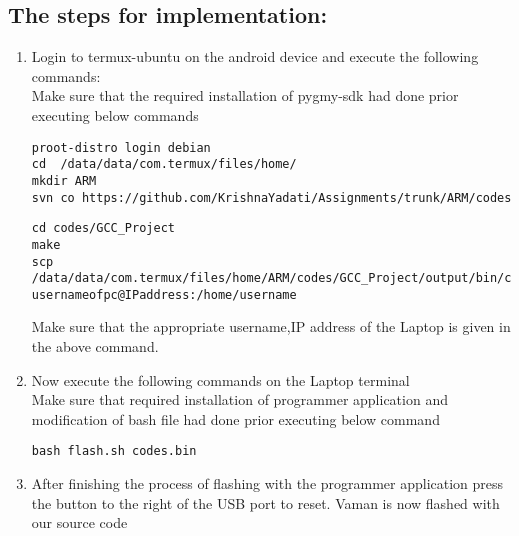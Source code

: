 \documentclass[10pt, a4paper]{article}
\begin{document}
\subsection{The steps for implementation:}
\begin{enumerate}
\item Login to termux-ubuntu on the android device and execute the following commands:\\
Make sure that the required installation of pygmy-sdk had done prior executing below commands
\begin{lstlisting}
proot-distro login debian
cd  /data/data/com.termux/files/home/
mkdir ARM
svn co https://github.com/KrishnaYadati/Assignments/trunk/ARM/codes
\end{lstlisting}
\begin{lstlisting}
cd codes/GCC_Project
make
scp /data/data/com.termux/files/home/ARM/codes/GCC_Project/output/bin/codes.bin usernameofpc@IPaddress:/home/username
\end{lstlisting}
Make sure that the appropriate username,IP address of the Laptop is given in the above command.
\item Now execute the following commands on the Laptop terminal\\
Make sure that required installation of programmer application and modification of bash file had done prior executing below command
\begin{lstlisting}
bash flash.sh codes.bin
\end{lstlisting}
\item After finishing the process of flashing with the programmer application press the button to the right of the USB port to reset. Vaman is now flashed with our source code
\end{enumerate}
\end{document}
